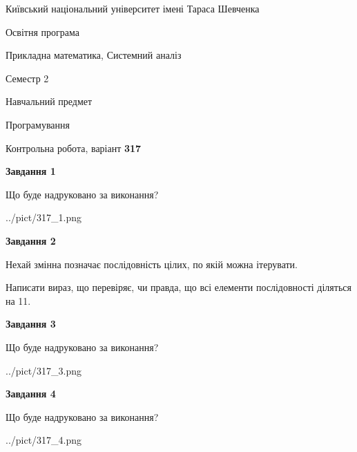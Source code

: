 \documentclass[12pt, ukrainian]{article}
\begin{document}
{{\begin {small}\par
{ \center  Київський національний університет імені Тараса Шевченка \par}
{\parbox {5 cm}{Освітня програма \hfill}{\parbox {8 cm}{Прикладна математика, Системний аналіз \hfill}}\parbox {5 cm}{\hfill Семестр 2}}\par
{\parbox {5 cm} {Навчальний предмет \hfill}\parbox {7 cm}{Програмування \hfill}\parbox {6cm}{\hfill}\par}\vspace{-7pt} \end{small}}{\center Контрольна робота, варіант  \No \textbf
{ 317 }\par}}
{
\begin {large}
{\begin {center}\textbf{Завдання 1}\end {center}}\par
Що буде надруковано за виконання?\par\par
\begin{center}
	{../pict/317_1.png}
\end{center}
\newpage

{\begin {center}\textbf{Завдання 2}\end {center}}\par
Нехай змінна  позначає послідовність цілих, по якій можна ітерувати.

Написати вираз, що перевіряє, чи правда, що всі елементи послідовності діляться на 11.\par
\newpage

{\begin {center}\textbf{Завдання 3}\end {center}}\par
Що буде надруковано за виконання?
\begin{center}
	{../pict/317_3.png}
\end{center}
\newpage

{\begin {center}\textbf{Завдання 4}\end {center}}\par
Що буде надруковано за виконання?\par
\begin{center}
	{../pict/317_4.png}
\end{center}
\newpage


\end{large}}
\end{document}
